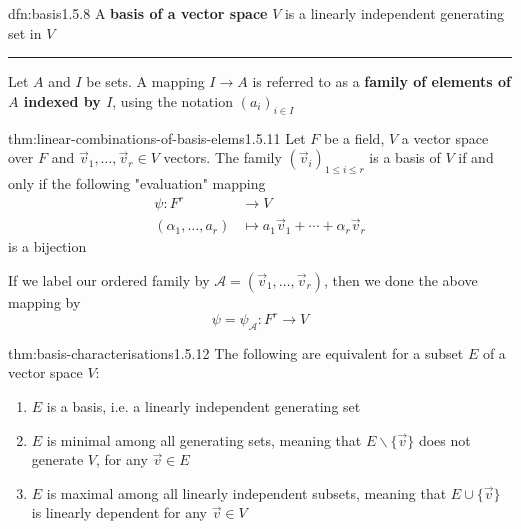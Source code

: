 \documentclass[landscape, 8pt]{extarticle}
\begin{document}
\begin{multicols}{3}

\begin{dfn}{dfn:basis}{1.5.8}
    A \textbf{basis of a vector space} $V$ is a linearly independent generating set in $V$

    \noindent\rule{\textwidth}{0.2pt}
    Let $A$ and $I$ be sets. A mapping $I\to A$ is referred to as a \textbf{family of elements of $A$ indexed by $I$}, using the notation $(a_{i})_{i\in I}$
\end{dfn}


\begin{thm}{thm:linear-combinations-of-basis-elems}{1.5.11}
    Let $F$ be a field, $V$ a vector space over $F$ and $\vec{v}_{1},\dots,\vec{v}_{r}\in V$ vectors. The family $(\vec{v}_{i})_{1\le i\le r}$ is a basis of $V$ if and only if the following "evaluation" mapping
    \begin{align*}
        \psi : F^{r} &\to V\\
        (\alpha_{1},\dots,a_{r}) &\mapsto a_{1}\vec{v}_{1} + \cdots + \alpha_{r}\vec{v}_{r}
    \end{align*}
    is a bijection

    If we label our ordered family by $\mathcal{A} = (\vec{v}_{1},\dots,\vec{v}_{r})$, then we done the above mapping by
    \[\psi = \psi_{\mathcal{A}} : F^{r}\to V\]
\end{thm}

\newpage
\vspace{-5pt}
\begin{thm}{thm:basis-characterisations}{1.5.12}
    The following are equivalent for a subset $E$ of a vector space $V$:
    \vspace{-5pt}
    \begin{enumerate}
        \setlength\itemsep{0em}
        \item $E$ is a basis, i.e. a linearly independent generating set
        \item $E$ is minimal among all generating sets, meaning that $E \backslash \{\vec{v}\}$ does not generate $V$, for any $\vec{v}\in E$
        \item $E$ is maximal among all linearly independent subsets, meaning that $E \cup \{\vec{v}\}$ is linearly dependent for any $\vec{v}\in V$
    \end{enumerate}


\end{thm}
\end{multicols}
\end{document}
